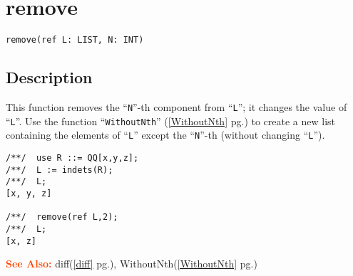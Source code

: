 \documentclass[a4paper]{mybook}
\newenvironment{command}{}{} %
\newcommand\SeeAlso{\par\textcolor{OrangeRed}{\textbf{\large See Also: }}}
\begin{document}
\section{remove}
\label{remove}
\begin{command} %


\begin{Verbatim}[label=syntax, rulecolor=\color{MidnightBlue},
frame=single]
remove(ref L: LIST, N: INT)
\end{Verbatim}


\subsection*{Description}

This function removes the ``\verb&N&''-th component from ``\verb&L&''; it changes the value of ``\verb&L&''.
Use the function ``\verb&WithoutNth&'' (\ref{WithoutNth} pg.\pageref{WithoutNth}) to create a new list containing the
elements of ``\verb&L&'' except the ``\verb&N&''-th (without changing ``\verb&L&'').
\begin{Verbatim}[label=example, rulecolor=\color{PineGreen}, frame=single]
/**/  use R ::= QQ[x,y,z];
/**/  L := indets(R);
/**/  L;
[x, y, z]

/**/  remove(ref L,2);
/**/  L;
[x, z]
\end{Verbatim}


\SeeAlso %
  diff(\ref{diff} pg.\pageref{diff}), 
    WithoutNth(\ref{WithoutNth} pg.\pageref{WithoutNth})
\end{command} %
\end{document}
